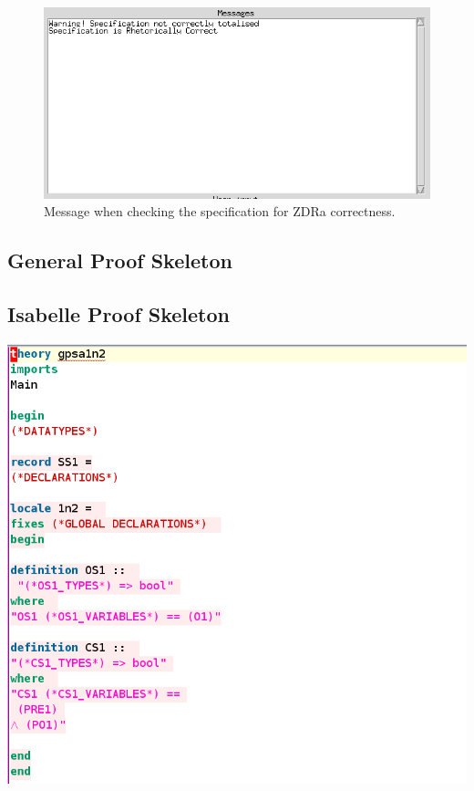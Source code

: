 \begin{figure}[H]
\includegraphics[scale=0.7]{examples/semiform/zdracorrect.png}
\caption{Message when checking the specification for ZDRa correctness.}
\end{figure}

\subsection{General Proof Skeleton}
\label{app:semiform3}


\subsection{Isabelle Proof Skeleton}
\label{app:semiform4}
\includegraphics[scale=0.5]{examples/semiform/4image.png}

